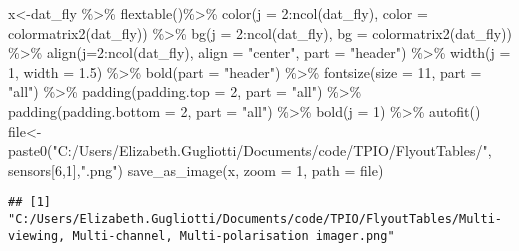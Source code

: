 \documentclass[
]{article}
\newenvironment{Shaded}{\begin{snugshade}}{\end{snugshade}}
\newcommand{\AttributeTok}[1]{\textcolor[rgb]{0.77,0.63,0.00}{#1}}
\newcommand{\DecValTok}[1]{\textcolor[rgb]{0.00,0.00,0.81}{#1}}
\newcommand{\FloatTok}[1]{\textcolor[rgb]{0.00,0.00,0.81}{#1}}
\newcommand{\FunctionTok}[1]{\textcolor[rgb]{0.00,0.00,0.00}{#1}}
\newcommand{\NormalTok}[1]{#1}
\newcommand{\OtherTok}[1]{\textcolor[rgb]{0.56,0.35,0.01}{#1}}
\newcommand{\SpecialCharTok}[1]{\textcolor[rgb]{0.00,0.00,0.00}{#1}}
\newcommand{\StringTok}[1]{\textcolor[rgb]{0.31,0.60,0.02}{#1}}
\begin{document}
\begin{Shaded}
\begin{Highlighting}[]
\NormalTok{x}\OtherTok{\textless{}{-}}\NormalTok{dat\_fly }\SpecialCharTok{\%\textgreater{}\%}
    \FunctionTok{flextable}\NormalTok{()}\SpecialCharTok{\%\textgreater{}\%}
    \FunctionTok{color}\NormalTok{(}\AttributeTok{j =} \DecValTok{2}\SpecialCharTok{:}\FunctionTok{ncol}\NormalTok{(dat\_fly), }\AttributeTok{color =} \FunctionTok{colormatrix2}\NormalTok{(dat\_fly)) }\SpecialCharTok{\%\textgreater{}\%}
    \FunctionTok{bg}\NormalTok{(}\AttributeTok{j =} \DecValTok{2}\SpecialCharTok{:}\FunctionTok{ncol}\NormalTok{(dat\_fly), }\AttributeTok{bg =} \FunctionTok{colormatrix2}\NormalTok{(dat\_fly)) }\SpecialCharTok{\%\textgreater{}\%}
    \FunctionTok{align}\NormalTok{(}\AttributeTok{j=}\DecValTok{2}\SpecialCharTok{:}\FunctionTok{ncol}\NormalTok{(dat\_fly), }\AttributeTok{align =} \StringTok{"center"}\NormalTok{, }\AttributeTok{part =} \StringTok{"header"}\NormalTok{) }\SpecialCharTok{\%\textgreater{}\%}
    \FunctionTok{width}\NormalTok{(}\AttributeTok{j =} \DecValTok{1}\NormalTok{, }\AttributeTok{width =} \FloatTok{1.5}\NormalTok{) }\SpecialCharTok{\%\textgreater{}\%}
    \FunctionTok{bold}\NormalTok{(}\AttributeTok{part =} \StringTok{"header"}\NormalTok{) }\SpecialCharTok{\%\textgreater{}\%}
    \FunctionTok{fontsize}\NormalTok{(}\AttributeTok{size =} \DecValTok{11}\NormalTok{, }\AttributeTok{part =} \StringTok{"all"}\NormalTok{) }\SpecialCharTok{\%\textgreater{}\%}
    \FunctionTok{padding}\NormalTok{(}\AttributeTok{padding.top =} \DecValTok{2}\NormalTok{, }\AttributeTok{part =} \StringTok{"all"}\NormalTok{) }\SpecialCharTok{\%\textgreater{}\%}
    \FunctionTok{padding}\NormalTok{(}\AttributeTok{padding.bottom =} \DecValTok{2}\NormalTok{, }\AttributeTok{part =} \StringTok{"all"}\NormalTok{) }\SpecialCharTok{\%\textgreater{}\%}
    \FunctionTok{bold}\NormalTok{(}\AttributeTok{j =} \DecValTok{1}\NormalTok{) }\SpecialCharTok{\%\textgreater{}\%} \FunctionTok{autofit}\NormalTok{()}
\NormalTok{file}\OtherTok{\textless{}{-}}\FunctionTok{paste0}\NormalTok{(}\StringTok{"C:/Users/Elizabeth.Gugliotti/Documents/code/TPIO/FlyoutTables/"}\NormalTok{, sensors[}\DecValTok{6}\NormalTok{,}\DecValTok{1}\NormalTok{],}\StringTok{".png"}\NormalTok{)}
\FunctionTok{save\_as\_image}\NormalTok{(x, }\AttributeTok{zoom =} \DecValTok{1}\NormalTok{, }\AttributeTok{path =}\NormalTok{ file)}
\end{Highlighting}
\end{Shaded}

\begin{verbatim}
## [1] "C:/Users/Elizabeth.Gugliotti/Documents/code/TPIO/FlyoutTables/Multi-viewing, Multi-channel, Multi-polarisation imager.png"
\end{verbatim}
\end{document}
